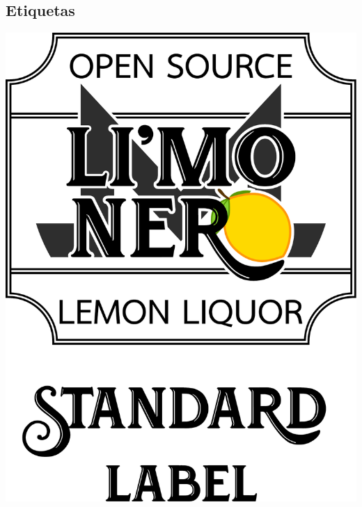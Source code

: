 \documentclass[12pt,a4paper]{article}
\begin{document}
\subsection{Etiquetas}
\begin{center}
\includegraphics[width=1\textwidth]{img/std-label.pdf}
\end{center}
\end{document}
